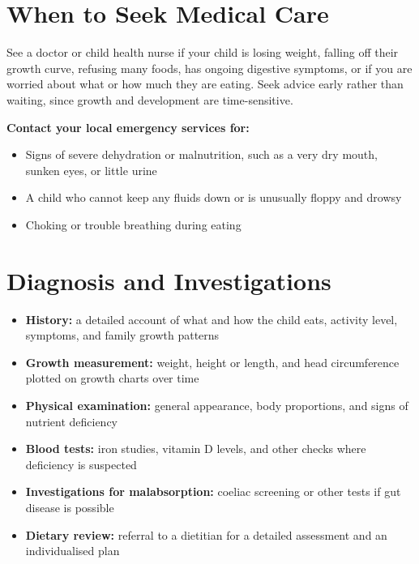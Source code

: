 \section*{When to Seek Medical Care}
See a doctor or child health nurse if your child is losing weight, falling off their growth curve, refusing many foods, has ongoing digestive symptoms, or if you are worried about what or how much they are eating. Seek advice early rather than waiting, since growth and development are time-sensitive.

\textbf{Contact your local emergency services for:}
\begin{itemize}
    \item Signs of severe dehydration or malnutrition, such as a very dry mouth, sunken eyes, or little urine
    \item A child who cannot keep any fluids down or is unusually floppy and drowsy
    \item Choking or trouble breathing during eating
\end{itemize}

\section*{Diagnosis and Investigations}
\begin{itemize}
    \item \textbf{History:} a detailed account of what and how the child eats, activity level, symptoms, and family growth patterns
    \item \textbf{Growth measurement:} weight, height or length, and head circumference plotted on growth charts over time
    \item \textbf{Physical examination:} general appearance, body proportions, and signs of nutrient deficiency
    \item \textbf{Blood tests:} iron studies, vitamin D levels, and other checks where deficiency is suspected
    \item \textbf{Investigations for malabsorption:} coeliac screening or other tests if gut disease is possible
    \item \textbf{Dietary review:} referral to a dietitian for a detailed assessment and an individualised plan
\end{itemize}

